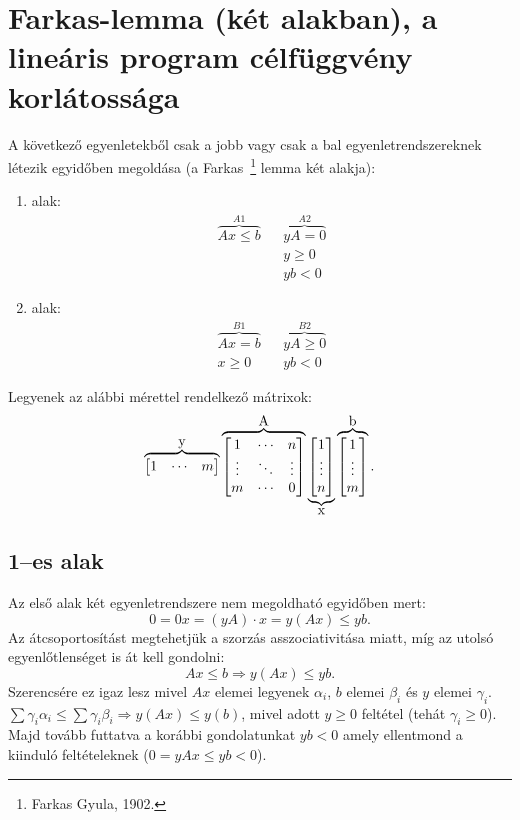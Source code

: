 \skiptooddpage
\section{Farkas-lemma (két alakban), a lineáris program célfüggvény korlátossága}

A következő egyenletekből csak a jobb vagy csak a bal egyenletrendszereknek
létezik egyidőben megoldása (a Farkas~\footnote{Farkas Gyula, 1902.} lemma két
alakja):

\begin{enumerate}
	\item alak: \begin{align*}
		      \overbrace{Ax \leq b}^{A1} &  & \overbrace{yA= 0}^{A2} \\
		                                 &  & y\geq 0                \\
		                                 &  & yb< 0
	      \end{align*}
	\item alak:\begin{align*}
		      \overbrace{Ax = b }^{B1} &  & \overbrace{yA \geq 0}^{B2} \\
		      x \geq 0                 &  & yb < 0
	      \end{align*}
\end{enumerate}

Legyenek az alábbi mérettel rendelkező mátrixok:
\[
	\overbrace{\begin{bmatrix} 1 &  \cdots &  m \end{bmatrix}}^{\hbox{y}}
	\overbrace{\begin{bmatrix} 1 & \cdots & n \\ \vdots & \ddots & \vdots \\ m  & \cdots & 0 \end{bmatrix}}^{\hbox{A}}
	\underbrace{\begin{bmatrix} 1 \\ \vdots \\  n \end{bmatrix}}_{\hbox{x}}
	\overbrace{\begin{bmatrix} 1 \\ \vdots \\  m \end{bmatrix}}^{\hbox{b}}.
\]

\subsection{1--es alak}
Az első alak két egyenletrendszere nem megoldható egyidőben mert:
\[ 0 = 0x = (yA) \cdot x = y(Ax) \leq yb.\] Az átcsoportosítást megtehetjük a
szorzás asszociativitása miatt, míg az utolsó egyenlőtlenséget is át kell
gondolni: \[ Ax \leq b \Rightarrow y(Ax) \leq yb.\] Szerencsére ez igaz lesz
mivel $Ax$ elemei legyenek $\alpha_i$, $b$ elemei $\beta_i$ és $y$ elemei
$\gamma_i$.
$\sum\gamma_i \alpha_i \leq \sum \gamma_i \beta_i \Rightarrow y(Ax) \leq y(b)$,
mivel adott $y \geq 0$ feltétel (tehát $\gamma_i \geq 0$). Majd tovább futtatva a
korábbi gondolatunkat $yb<0$ amely ellentmond a kiinduló feltételeknek ($0=yAx \leq yb<0$).

